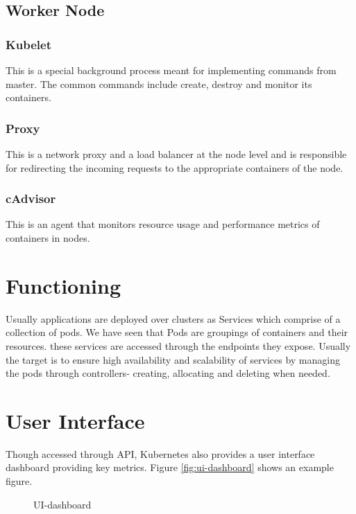 \documentclass[9pt,twocolumn,twoside]{styles/osajnl}
\begin{document}
\subsection{Worker Node}
\subsubsection{Kubelet}
This is a special background process meant for implementing commands from master. The common commands include create, destroy and monitor its containers.
\subsubsection{Proxy}
This is a network proxy and a load balancer at the node level and is responsible for redirecting the incoming requests to the appropriate containers of the node.
\subsubsection{cAdvisor}
This is an agent that monitors resource usage and performance metrics of containers in nodes.
\section{Functioning}

Usually applications are deployed over clusters as Services which comprise of a collection of pods. We have seen that Pods are groupings of containers and their resources. these services are accessed through the endpoints they expose. Usually the target is to ensure high availability and scalability of services by managing the pods through controllers- creating, allocating and deleting when needed.
\section{User Interface}
Though accessed through API, Kubernetes also provides 
a user interface dashboard providing key metrics.
Figure \ref{fig:ui-dashboard} shows an example figure.

\begin{figure}[htbp]
\centering
{}
\caption{UI-dashboard \cite{www-kubernetesuidoc}}
\label{fig:Kubernetes UI-dashboard}
\end{figure}
\end{document}

